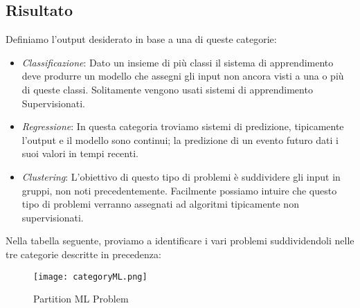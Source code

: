 \documentclass[../tesi.tex]{subfiles}
\begin{document}
\subsection{Risultato}
Definiamo l’output desiderato in base a una di queste categorie:

\begin{itemize}
  \item \textit{Classificazione}: Dato un insieme di più classi il sistema di apprendimento deve produrre un modello che assegni gli input non ancora visti a una o più di queste classi. Solitamente vengono usati sistemi di apprendimento Supervisionati.
  \item \textit{Regressione}: In questa categoria troviamo sistemi di predizione, tipicamente l’output e il modello sono continui; la predizione di un evento futuro dati i suoi valori in tempi recenti.
  \item \textit{Clustering}: L’obiettivo di questo tipo di problemi è suddividere gli input in gruppi, non noti precedentemente. Facilmente possiamo intuire che questo tipo di problemi verranno assegnati ad algoritmi tipicamente non supervisionati.
\end{itemize}

Nella tabella seguente, proviamo a identificare i vari problemi suddividendoli nelle tre categorie descritte in precedenza:
\begin{figure}[htbp]
  \texttt{[image: categoryML.png]}
  \caption{Partition ML Problem} 
  \end{figure}
  \newpage
\end{document}
